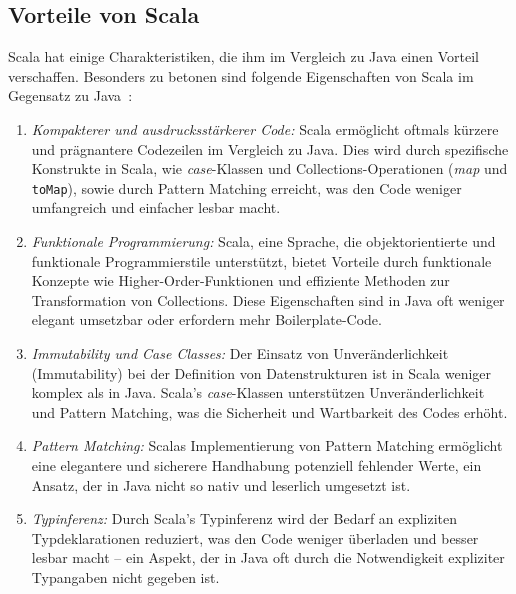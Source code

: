 \subsection{Vorteile von Scala}
Scala hat einige Charakteristiken, die ihm im Vergleich zu Java einen Vorteil verschaffen.
Besonders zu betonen sind folgende Eigenschaften von Scala im Gegensatz zu Java~\cite{epfl_scala_nodate-1, epfl_scala_nodate-2}: %

\begin{enumerate}
    \item \emph{Kompakterer und ausdrucksstärkerer Code:} Scala ermöglicht oftmals kürzere und prägnantere Codezeilen im Vergleich zu Java. Dies wird durch spezifische Konstrukte in Scala, wie \emph{case}-Klassen und Collections-Operationen (\emph{map} und \texttt{toMap}), sowie durch Pattern Matching erreicht, was den Code weniger umfangreich und einfacher lesbar macht.
    
    \item \emph{Funktionale Programmierung:} Scala, eine Sprache, die objektorientierte und funktionale Programmierstile unterstützt, bietet Vorteile durch funktionale Konzepte wie Higher-Order-Funktionen und effiziente Methoden zur Transformation von Collections. Diese Eigenschaften sind in Java oft weniger elegant umsetzbar oder erfordern mehr Boilerplate-Code.
    
    \item \emph{Immutability und Case Classes:} Der Einsatz von Unveränderlichkeit (Immutability) bei der Definition von Datenstrukturen ist in Scala weniger komplex als in Java. Scala's \emph{case}-Klassen unterstützen Unveränderlichkeit und Pattern Matching, was die Sicherheit und Wartbarkeit des Codes erhöht.
    
    \item \emph{Pattern Matching:} Scalas Implementierung von Pattern Matching ermöglicht eine elegantere und sicherere Handhabung potenziell fehlender Werte, ein Ansatz, der in Java nicht so nativ und leserlich umgesetzt ist.
    
    \item \emph{Typinferenz:} Durch Scala's Typinferenz wird der Bedarf an expliziten Typdeklarationen reduziert, was den Code weniger überladen und besser lesbar macht – ein Aspekt, der in Java oft durch die Notwendigkeit expliziter Typangaben nicht gegeben ist.
\end{enumerate}


